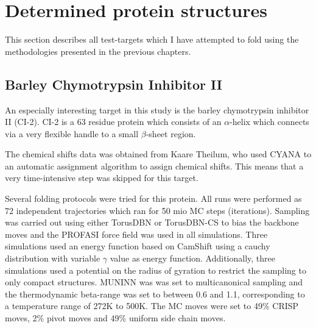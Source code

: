 \chapter{Determined protein structures}
This section describes all test-targets which I have attempted to fold using the methodologies presented in the previous chapters.

\section{Barley Chymotrypsin Inhibitor II}

An especially interesting target in this study is the barley chymotrypsin inhibitor II (CI-2). CI-2 is a 63 residue protein which consists of an $\alpha$-helix which connects via a very flexible handle to a small $\beta$-sheet region.

The chemical shifts data was obtained from Kaare Theilum, who used CYANA to an automatic assignment algorithm to assign chemical shifts. This means that a very time-intensive step was skipped for this target. 

Several folding protocols were tried for this protein. All runs were performed as 72 independent trajectories which ran for 50 mio MC steps (iterations). Sampling was carried out using either TorusDBN or TorusDBN-CS to bias the backbone moves and the PROFASI force field was used in all simulations. Three simulations used an energy function based on CamShift using a cauchy distribution with variable $\gamma$ value as energy function. Additionally, three simulations used a potential on the radius of gyration to restrict the sampling to only compact structures. MUNINN was was set to multicanonical sampling and the thermodynamic beta-range was set to between 0.6 and 1.1, corresponding to a temperature range of 272K to 500K. The MC moves were set to 49\% CRISP moves, 2\% pivot moves and 49\% uniform side chain moves.



